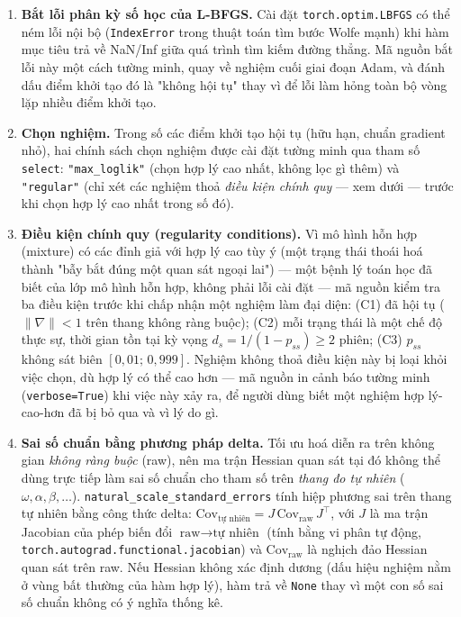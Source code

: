 \documentclass[11pt,a4paper]{article}
\newcommand{\code}[1]{\texttt{#1}}
\begin{document}
\begin{enumerate}
    tới đỉnh).
  \item \textbf{Bắt lỗi phân kỳ số học của L-BFGS.} Cài đặt \code{torch.optim.LBFGS}
    có thể ném lỗi nội bộ (\code{IndexError} trong thuật toán tìm bước Wolfe mạnh)
    khi hàm mục tiêu trả về NaN/Inf giữa quá trình tìm kiếm đường thẳng. Mã nguồn bắt
    lỗi này một cách tường minh, quay về nghiệm cuối giai đoạn Adam, và đánh dấu điểm
    khởi tạo đó là "không hội tụ" thay vì để lỗi làm hỏng toàn bộ vòng lặp nhiều điểm
    khởi tạo.
  \item \textbf{Chọn nghiệm.} Trong số các điểm khởi tạo hội tụ (hữu hạn, chuẩn
    gradient nhỏ), hai chính sách chọn nghiệm được cài đặt tường minh qua tham số
    \code{select}: \code{"max\_loglik"} (chọn hợp lý cao nhất, không lọc gì thêm) và
    \code{"regular"} (chỉ xét các nghiệm thoả \emph{điều kiện chính quy} --- xem
    dưới --- trước khi chọn hợp lý cao nhất trong số đó).
  \item \textbf{Điều kiện chính quy (regularity conditions).} Vì mô hình hỗn hợp
    (mixture) có các đỉnh giả với hợp lý cao tùy ý (một trạng thái thoái hoá thành
    "bẫy bắt đúng một quan sát ngoại lai") --- một bệnh lý toán học đã biết của lớp
    mô hình hỗn hợp, không phải lỗi cài đặt --- mã nguồn kiểm tra ba điều kiện trước
    khi chấp nhận một nghiệm làm đại diện: (C1) đã hội tụ ($\lVert\nabla\rVert<1$
    trên thang không ràng buộc); (C2) mỗi trạng thái là một chế độ thực sự, thời gian
    tồn tại kỳ vọng $d_s = 1/(1-p_{ss}) \ge 2$ phiên; (C3) $p_{ss}$ không sát biên
    $[0{,}01;\,0{,}999]$. Nghiệm không thoả điều kiện này bị loại khỏi việc chọn, dù
    hợp lý có thể cao hơn --- mã nguồn in cảnh báo tường minh (\code{verbose=True})
    khi việc này xảy ra, để người dùng biết một nghiệm hợp lý-cao-hơn đã bị bỏ qua và
    vì lý do gì.
  \item \textbf{Sai số chuẩn bằng phương pháp delta.} Tối ưu hoá diễn ra trên không
    gian \emph{không ràng buộc} (raw), nên ma trận Hessian quan sát tại đó không thể
    dùng trực tiếp làm sai số chuẩn cho tham số trên \emph{thang đo tự nhiên}
    ($\omega,\alpha,\beta,\dots$). \code{natural\_scale\_standard\_errors} tính hiệp
    phương sai trên thang tự nhiên bằng công thức delta: $\mathrm{Cov}_{\text{tự
    nhiên}} = J\, \mathrm{Cov}_{\text{raw}}\, J^\top$, với $J$ là ma trận Jacobian của
    phép biến đổi $\text{raw}\to\text{tự nhiên}$ (tính bằng vi phân tự động,
    \code{torch.autograd.functional.jacobian}) và $\mathrm{Cov}_{\text{raw}}$ là
    nghịch đảo Hessian quan sát trên raw. Nếu Hessian không xác định dương (dấu hiệu
    nghiệm nằm ở vùng bất thường của hàm hợp lý), hàm trả về \code{None} thay vì một
    con số sai số chuẩn không có ý nghĩa thống kê.
\end{enumerate}
\end{document}
